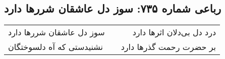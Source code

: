 \begin{center}
\section*{رباعی شماره ۷۳۵: سوز دل عاشقان شررها دارد}
\label{sec:0735}
\begin{longtable}{l p{0.5cm} r}
سوز دل عاشقان شررها دارد
&&
درد دل بی‌دلان اثرها دارد
\\
نشنیدستی که آه دلسوختگان
&&
بر حضرت رحمت گذرها دارد
\\
\end{longtable}
\end{center}
